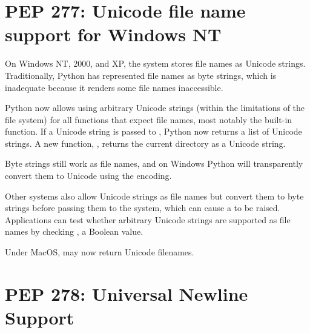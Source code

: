 \documentclass{howto}
\begin{document}
\begin{seealso}


\end{seealso}


\section{PEP 277: Unicode file name support for Windows NT}

On Windows NT, 2000, and XP, the system stores file names as Unicode
strings. Traditionally, Python has represented file names as byte
strings, which is inadequate because it renders some file names
inaccessible.

Python now allows using arbitrary Unicode strings (within the
limitations of the file system) for all functions that expect file
names, most notably the  built-in function. If a Unicode
string is passed to , Python now returns a list
of Unicode strings.  A new function, , returns
the current directory as a Unicode string.

Byte strings still work as file names, and on Windows Python will
transparently convert them to Unicode using the  encoding.

Other systems also allow Unicode strings as file names but convert
them to byte strings before passing them to the system, which can
cause a  to be raised. Applications can test
whether arbitrary Unicode strings are supported as file names by
checking , a Boolean value.

Under MacOS,  may now return Unicode filenames.

\begin{seealso}


\end{seealso}


\section{PEP 278: Universal Newline Support}
\end{document}
